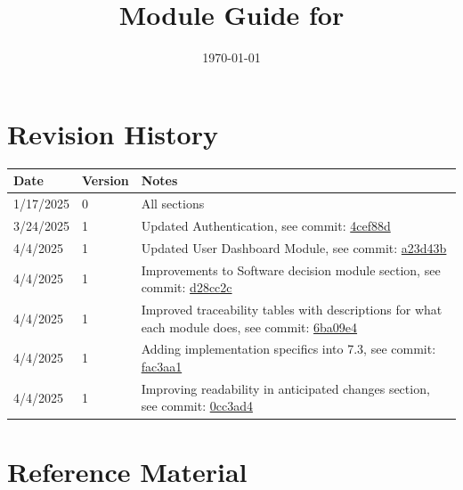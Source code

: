 \documentclass[12pt, titlepage]{article}
\begin{document}
\title{Module Guide for \progname{}} 
\author{\authname}
\date{\today}

\maketitle


\section{Revision History}

\begin{tabularx}{\textwidth}{p{3cm}p{2cm}X}
\toprule {\bf Date} & {\bf Version} & {\bf Notes}\\
\midrule
1/17/2025 & 0 & All sections\\
3/24/2025 & 1 & Updated Authentication, see commit: \href{https://github.com/ausbennett/mes-finance-platform/commit/4cef88de4d7c2a664fa8e2395804251c0a6baeb4}{4cef88d}\\
4/4/2025 & 1 & Updated User Dashboard Module, see commit: \href{https://github.com/ausbennett/mes-finance-platform/commit/a23d43b84b1426d0f6a8d13d3120043a0d8c54b3}{a23d43b}\\
4/4/2025 & 1 & Improvements to Software decision module section, see commit: \href{https://github.com/ausbennett/mes-finance-platform/commit/d28cc2c30433566afcd2b0621950a5832a6cc40e}{d28cc2c}\\
4/4/2025 & 1 & Improved traceability tables with descriptions for what each module does, see commit: \href{https://github.com/ausbennett/mes-finance-platform/commit/6ba09e4a79e3f6a3cf5ef14b3514668898f55438}{6ba09e4}\\
4/4/2025 & 1 & Adding implementation specifics into 7.3, see commit: \href{https://github.com/ausbennett/mes-finance-platform/commit/fac3aa1adfd32881adc95c603df28100f891b46a}{fac3aa1}\\
4/4/2025 & 1 & Improving readability in anticipated changes section, see commit: \href{https://github.com/ausbennett/mes-finance-platform/commit/0cc3ad45ad4c4781cc4ed82fac16693b40476860}{0cc3ad4}\\
\bottomrule
\end{tabularx}

\newpage

\section{Reference Material}
\end{document}
